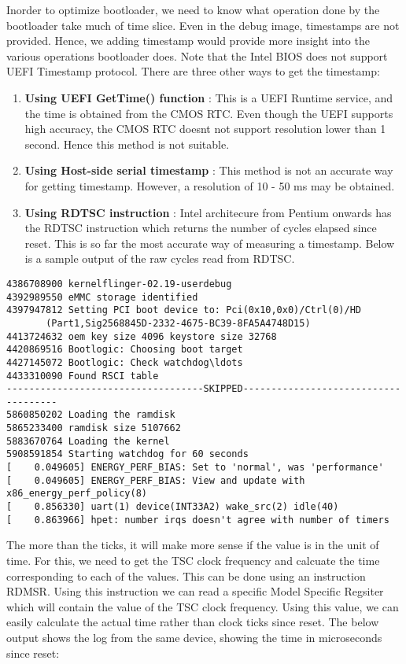 Inorder to optimize bootloader, we need to know what operation done by the
bootloader take much of time slice. Even in the debug image, timestamps
are not provided. Hence, we adding timestamp would provide more insight into
the various operations bootloader does. Note that the 
Intel BIOS does not support UEFI Timestamp protocol. There are three
other ways to get the timestamp:

\begin{enumerate}
	\item \textbf{Using UEFI GetTime() function} :
		This is a UEFI Runtime service, and the time is obtained from the CMOS RTC.
		Even though the UEFI supports high accuracy, the CMOS RTC doesnt not support
		resolution lower than 1 second. Hence this method is not suitable.
	\item \textbf{Using Host-side serial timestamp} :
		This method is not an accurate way for getting timestamp.
		However, a resolution of 10 - 50 ms may be obtained.
	\item \textbf{Using RDTSC instruction} :
		Intel architecure from Pentium onwards has the RDTSC instruction
		which returns the number of cycles elapsed since reset. This is so
		far the most accurate way of measuring a timestamp. Below is a
		sample output of the raw cycles read from RDTSC.	
\end{enumerate}

\begin{Verbatim}[fontsize=\small]
4386708900 kernelflinger-02.19-userdebug
4392989550 eMMC storage identified
4397947812 Setting PCI boot device to: Pci(0x10,0x0)/Ctrl(0)/HD
	   (Part1,Sig2568845D-2332-4675-BC39-8FA5A4748D15)
4413724632 oem key size 4096 keystore size 32768
4420869516 Bootlogic: Choosing boot target
4427145072 Bootlogic: Check watchdog\ldots
4433310090 Found RSCI table
-----------------------------------SKIPPED-------------------------------------
5860850202 Loading the ramdisk
5865233400 ramdisk size 5107662
5883670764 Loading the kernel
5908591854 Starting watchdog for 60 seconds
[    0.049605] ENERGY_PERF_BIAS: Set to 'normal', was 'performance'
[    0.049605] ENERGY_PERF_BIAS: View and update with x86_energy_perf_policy(8)
[    0.856330] uart(1) device(INT33A2) wake_src(2) idle(40)
[    0.863966] hpet: number irqs doesn't agree with number of timers
\end{Verbatim}

The more than the ticks, it will make more sense if the value is in the unit of time.
For this, we need to get the TSC clock frequency and calcuate the time corresponding
to each of the values. This can be done using an instruction RDMSR. Using this
instruction we can read a specific Model Specific Regsiter which will contain the value
of the TSC clock frequency. Using this value, we can easily calculate the actual time
rather than clock ticks since reset. The below output shows the log from the same
device, showing the time in microseconds since reset:

